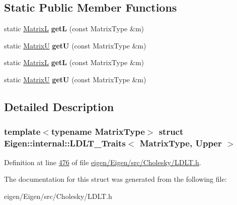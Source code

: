 \subsection*{Static Public Member Functions}
\begin{DoxyCompactItemize}
\item 
\mbox{\label{struct_eigen_1_1internal_1_1_l_d_l_t___traits_3_01_matrix_type_00_01_upper_01_4_a85ba974cb566d0b44548c47385805951}} 
static \hyperlink{group___core___module_class_eigen_1_1_triangular_view}{MatrixL} {\bfseries getL} (const Matrix\+Type \&m)
\item 
\mbox{\label{struct_eigen_1_1internal_1_1_l_d_l_t___traits_3_01_matrix_type_00_01_upper_01_4_aafa2890ad490dd6697899d0cc19cdeac}} 
static \hyperlink{group___core___module_class_eigen_1_1_triangular_view}{MatrixU} {\bfseries getU} (const Matrix\+Type \&m)
\item 
\mbox{\label{struct_eigen_1_1internal_1_1_l_d_l_t___traits_3_01_matrix_type_00_01_upper_01_4_a85ba974cb566d0b44548c47385805951}} 
static \hyperlink{group___core___module_class_eigen_1_1_triangular_view}{MatrixL} {\bfseries getL} (const Matrix\+Type \&m)
\item 
\mbox{\label{struct_eigen_1_1internal_1_1_l_d_l_t___traits_3_01_matrix_type_00_01_upper_01_4_aafa2890ad490dd6697899d0cc19cdeac}} 
static \hyperlink{group___core___module_class_eigen_1_1_triangular_view}{MatrixU} {\bfseries getU} (const Matrix\+Type \&m)
\end{DoxyCompactItemize}


\subsection{Detailed Description}
\subsubsection*{template$<$typename Matrix\+Type$>$\newline
struct Eigen\+::internal\+::\+L\+D\+L\+T\+\_\+\+Traits$<$ Matrix\+Type, Upper $>$}



Definition at line \hyperlink{eigen_2_eigen_2src_2_cholesky_2_l_d_l_t_8h_source_l00476}{476} of file \hyperlink{eigen_2_eigen_2src_2_cholesky_2_l_d_l_t_8h_source}{eigen/\+Eigen/src/\+Cholesky/\+L\+D\+L\+T.\+h}.



The documentation for this struct was generated from the following file\+:\begin{DoxyCompactItemize}
\item 
eigen/\+Eigen/src/\+Cholesky/\+L\+D\+L\+T.\+h\end{DoxyCompactItemize}

